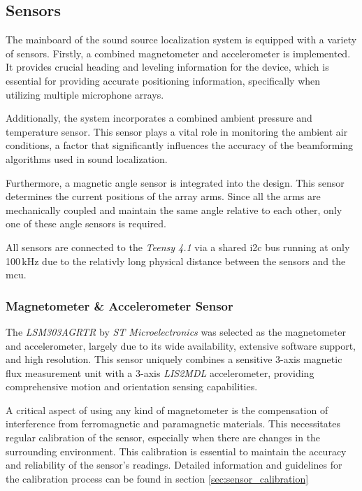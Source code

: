 \subsection{Sensors}
The mainboard of the sound source localization system is equipped with a variety of sensors.
Firstly, a combined magnetometer and accelerometer is implemented.
It provides crucial heading and leveling information for the device,
which is essential for providing accurate positioning information, specifically when utilizing multiple microphone arrays.

Additionally, the system incorporates a combined ambient pressure and temperature sensor.
This sensor plays a vital role in monitoring the ambient air conditions, a factor that significantly influences the accuracy of the beamforming algorithms used in sound localization.

Furthermore, a magnetic angle sensor is integrated into the design.
This sensor determines the current positions of the array arms.
Since all the arms are mechanically coupled and maintain the same angle relative to each other, only one of these angle sensors is required.

All sensors are connected to the \textit{Teensy 4.1} via a shared \acrshort{i2c} bus running at only 100\,kHz due to the relativly long physical distance between the sensors and the \acrshort{mcu}.
\newpage

\subsubsection{Magnetometer \& Accelerometer Sensor}
The \textit{LSM303AGRTR} by \textit{ST Microelectronics} was selected as the magnetometer and accelerometer, largely due to its wide availability, extensive software support, and high resolution.
This sensor uniquely combines a sensitive 3-axis magnetic flux measurement unit with a 3-axis \textit{LIS2MDL} accelerometer, providing comprehensive motion and orientation sensing capabilities.

A critical aspect of using any kind of magnetometer is the compensation of interference from ferromagnetic and paramagnetic materials.
This necessitates regular calibration of the sensor, especially when there are changes in the surrounding environment.
This calibration is essential to maintain the accuracy and reliability of the sensor's readings.
Detailed information and guidelines for the calibration process can be found in section \ref{sec:sensor_calibration}

